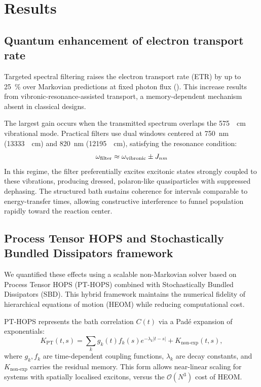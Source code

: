 
\section{Results}\label{sec:Results}

\subsection{Quantum enhancement of electron transport rate}

Targeted spectral filtering raises the electron transport rate (ETR) by up to \SI{25}{\percent} over Markovian predictions at fixed photon flux (). This increase results from vibronic-resonance-assisted transport, a memory-dependent mechanism absent in classical designs.

The largest gain occurs when the transmitted spectrum overlaps the \SI{575}{\per\cm} vibrational mode. Practical filters use dual windows centered at \SI{750}{\nano\meter} (\SI{13333}{\per\cm}) and \SI{820}{\nano\meter} (\SI{12195}{\per\cm}), satisfying the resonance condition:
\begin{equation}\label{eq:resonance_condition}
\omega_{\rm filter}\approx\omega_{\rm vibronic}\pm J_{nm}
\end{equation}
In this regime, the filter preferentially excites excitonic states strongly coupled to these vibrations, producing dressed, polaron-like quasiparticles with suppressed dephasing. The structured bath sustains coherence for intervals comparable to energy-transfer times, allowing constructive interference to funnel population rapidly toward the reaction center.

\subsection{Process Tensor HOPS and Stochastically Bundled Dissipators framework}

We quantified these effects using a scalable non-Markovian solver based on Process Tensor HOPS (PT-HOPS) combined with Stochastically Bundled Dissipators (SBD). This hybrid framework maintains the numerical fidelity of hierarchical equations of motion (HEOM) while reducing computational cost.

PT-HOPS represents the bath correlation $C(t)$ via a Pad\'e expansion of exponentials:
\begin{equation}\label{eq:pt_decomposition}
K_{\mathrm{PT}}(t,s)=\sum_k g_k(t)f_k(s)e^{-\lambda_k|t-s|}+K_{\mathrm{non\text{-}exp}}(t,s),
\end{equation}
where $g_k,f_k$ are time-dependent coupling functions, $\lambda_k$ are decay constants, and $K_{\mathrm{non\text{-}exp}}$ carries the residual memory. This form allows near-linear scaling for systems with spatially localised excitons, versus the $\mathcal{O}(N^3)$ cost of HEOM.

